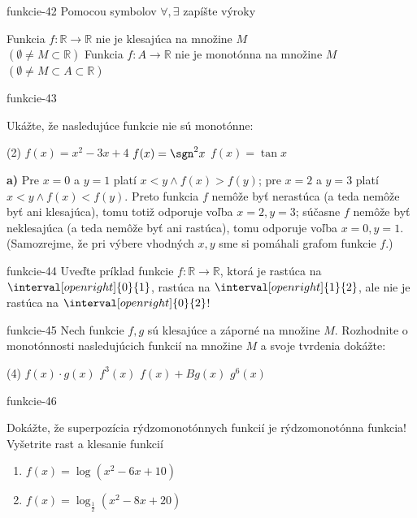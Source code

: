 \begin{defproblem}{funkcie-42}
Pomocou symbolov $\forall,\exists$ zapíšte výroky
\begin{tasks}
\task
  Funkcia $f:\mathbb{R} \rightarrow \mathbb{R}$ nie je klesajúca na množine $M$ \\
  $(\emptyset \neq M\subset\mathbb{R})$
\task
  Funkcia $f:A \rightarrow \mathbb{R}$ nie je monotónna na množine $M$ \\
  $(\emptyset \neq M\subset A \subset\mathbb{R})$
\end{tasks}
\end{defproblem}

\begin{defproblem}{funkcie-43}
\begin{samepage}
Ukážte, že nasledujúce funkcie nie sú monotónne:
\begin{tasks}(2)
  \task $f(x) = x^2 - 3x + 4$
  \task $f(x) = \sgn^2 x$
  \task $f(x) = \tan x$
\end{tasks}
\end{samepage}
\begin{solution}
  \textbf{a)}
  Pre $x=0$ a $y=1$ platí $x<y\wedge f(x)>f(y)$; pre $x=2$ a $y=3$ platí
  $x<y\wedge f(x)<f(y)$. Preto funkcia $f$ nemôže byť nerastúca (a teda nemôže
  byť ani klesajúca), tomu totiž odporuje voľba $x=2,y=3$; súčasne $f$ nemôže
  byť neklesajúca (a teda nemôže byť ani rastúca), tomu odporuje voľba
  $x=0,y=1$. (Samozrejme, že pri výbere vhodných $x,y$ sme si pomáhali grafom
  funkcie $f$.)
  \end{solution}
\end{defproblem}

\begin{defproblem}{funkcie-44}
Uveďte príklad funkcie $f:\mathbb{R} \rightarrow \mathbb{R}$, ktorá je rastúca
na $\interval[open right]{0}{1}$, rastúca na $\interval[open right]{1}{2}$, ale
nie je rastúca na $\interval[open right]{0}{2}$!
\end{defproblem}

\begin{defproblem}{funkcie-45}
Nech funkcie $f,g$ sú klesajúce a záporné na množine $M$. Rozhodnite o
monotónnosti nasledujúcich funkcií na množine $M$ a svoje tvrdenia dokážte:
\begin{tasks}(4)
  \task $f(x) \cdot g(x)$
  \task $f^3(x)$
  \task $f(x) + Bg(x)$
  \task $g^6(x)$
\end{tasks}
\end{defproblem}

\begin{defproblem}{funkcie-46}
\begin{tasks}
\task Dokážte, že superpozícia rýdzomonotónnych funkcií je rýdzomonotónna funkcia!
\task Vyšetrite rast a klesanie funkcií
\begin{enumerate}
  \item $f(x)=\log (x^2-6x+10)$
  \item $f(x)=\log_\frac{1}{2}(x^2-8x+20)$
\end{enumerate}
\end{tasks}
\end{defproblem}

